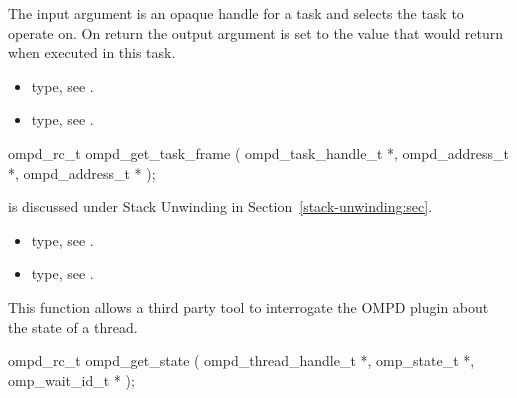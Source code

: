 \argdesc
The input argument  is an opaque handle for a task and selects the task to operate on.
On return the output argument  is set to the value that  would return when
executed in this task.

\crossreferences
\begin{itemize}
	\item {} type, see .
	\item {} type, see .
\end{itemize}



%
\label{ompd:ompd_get_task_frame}
\summary

\format
\cspecificstart
\begin{boxedcode}
ompd\_rc\_t ompd\_get\_task\_frame (
  ompd\_task\_handle\_t  *, 
  ompd\_address\_t  *,
  ompd\_address\_t *
);
\end{boxedcode}
\cspecificend



\descr
{} is discussed under Stack Unwinding in
Section~\ref{stack-unwinding:sec}.

\argdesc


\crossreferences
\begin{itemize}
	\item {} type, see .
	\item {} type, see .
\end{itemize}


\label{ompd:ompd_get_state}
\summary
This function allows a third party tool to interrogate the OMPD plugin about the state of a thread.

\format
\cspecificstart
\begin{boxedcode}
ompd\_rc\_t ompd\_get\_state (
  ompd\_thread\_handle\_t *,
  omp\_state\_t *,
  omp\_wait\_id\_t    *
);
\end{boxedcode}
\cspecificend

